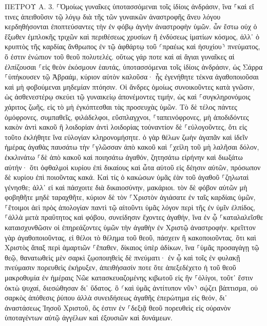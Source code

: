 \documentclass[twoside, 9pt]{extreport}
\begin{document}
ΠΕΤΡΟΥ Α.
3.
⸀Ὁμοίως γυναῖκες ὑποτασσόμεναι τοῖς ἰδίοις ἀνδράσιν, ἵνα ⸀καὶ εἴ τινες ἀπειθοῦσιν τῷ λόγῳ διὰ τῆς τῶν γυναικῶν ἀναστροφῆς ἄνευ λόγου κερδηθήσονται 
ἐποπτεύσαντες τὴν ἐν φόβῳ ἁγνὴν ἀναστροφὴν ὑμῶν. 
ὧν ἔστω οὐχ ὁ ἔξωθεν ἐμπλοκῆς τριχῶν καὶ περιθέσεως χρυσίων ἢ ἐνδύσεως ἱματίων κόσμος, 
ἀλλ᾽ ὁ κρυπτὸς τῆς καρδίας ἄνθρωπος ἐν τῷ ἀφθάρτῳ τοῦ ⸂πραέως καὶ ἡσυχίου⸃ πνεύματος, ὅ ἐστιν ἐνώπιον τοῦ θεοῦ πολυτελές. 
οὕτως γάρ ποτε καὶ αἱ ἅγιαι γυναῖκες αἱ ἐλπίζουσαι ⸀εἰς θεὸν ἐκόσμουν ἑαυτάς, ὑποτασσόμεναι τοῖς ἰδίοις ἀνδράσιν, 
ὡς Σάρρα ⸀ὑπήκουσεν τῷ Ἀβραάμ, κύριον αὐτὸν καλοῦσα· ἧς ἐγενήθητε τέκνα ἀγαθοποιοῦσαι καὶ μὴ φοβούμεναι μηδεμίαν πτόησιν. 
Οἱ ἄνδρες ὁμοίως συνοικοῦντες κατὰ γνῶσιν, ὡς ἀσθενεστέρῳ σκεύει τῷ γυναικείῳ ἀπονέμοντες τιμήν, ὡς καὶ ⸀συγκληρονόμοις χάριτος ζωῆς, εἰς τὸ μὴ ἐγκόπτεσθαι τὰς προσευχὰς ὑμῶν. 
Τὸ δὲ τέλος πάντες ὁμόφρονες, συμπαθεῖς, φιλάδελφοι, εὔσπλαγχνοι, ⸀ταπεινόφρονες, 
μὴ ἀποδιδόντες κακὸν ἀντὶ κακοῦ ἢ λοιδορίαν ἀντὶ λοιδορίας τοὐναντίον δὲ ⸀εὐλογοῦντες, ὅτι εἰς τοῦτο ἐκλήθητε ἵνα εὐλογίαν κληρονομήσητε. 
ὁ γὰρ θέλων ζωὴν ἀγαπᾶν καὶ ἰδεῖν ἡμέρας ἀγαθὰς παυσάτω τὴν ⸀γλῶσσαν ἀπὸ κακοῦ καὶ ⸀χείλη τοῦ μὴ λαλῆσαι δόλον, 
ἐκκλινάτω ⸀δὲ ἀπὸ κακοῦ καὶ ποιησάτω ἀγαθόν, ζητησάτω εἰρήνην καὶ διωξάτω αὐτήν· 
ὅτι ὀφθαλμοὶ κυρίου ἐπὶ δικαίους καὶ ὦτα αὐτοῦ εἰς δέησιν αὐτῶν, πρόσωπον δὲ κυρίου ἐπὶ ποιοῦντας κακά. 
Καὶ τίς ὁ κακώσων ὑμᾶς ἐὰν τοῦ ἀγαθοῦ ⸀ζηλωταὶ γένησθε; 
ἀλλ᾽ εἰ καὶ πάσχοιτε διὰ δικαιοσύνην, μακάριοι. τὸν δὲ φόβον αὐτῶν μὴ φοβηθῆτε μηδὲ ταραχθῆτε, 
κύριον δὲ τὸν ⸀Χριστὸν ἁγιάσατε ἐν ταῖς καρδίαις ὑμῶν, ⸀ἕτοιμοι ἀεὶ πρὸς ἀπολογίαν παντὶ τῷ αἰτοῦντι ὑμᾶς λόγον περὶ τῆς ἐν ὑμῖν ἐλπίδος, 
⸀ἀλλὰ μετὰ πραΰτητος καὶ φόβου, συνείδησιν ἔχοντες ἀγαθήν, ἵνα ἐν ᾧ ⸀καταλαλεῖσθε καταισχυνθῶσιν οἱ ἐπηρεάζοντες ὑμῶν τὴν ἀγαθὴν ἐν Χριστῷ ἀναστροφήν. 
κρεῖττον γὰρ ἀγαθοποιοῦντας, εἰ θέλοι τὸ θέλημα τοῦ θεοῦ, πάσχειν ἢ κακοποιοῦντας. 
ὅτι καὶ Χριστὸς ἅπαξ περὶ ἁμαρτιῶν ⸀ἔπαθεν, δίκαιος ὑπὲρ ἀδίκων, ἵνα ⸀ὑμᾶς προσαγάγῃ τῷ θεῷ, θανατωθεὶς μὲν σαρκὶ ζῳοποιηθεὶς δὲ πνεύματι· 
ἐν ᾧ καὶ τοῖς ἐν φυλακῇ πνεύμασιν πορευθεὶς ἐκήρυξεν, 
ἀπειθήσασίν ποτε ὅτε ἀπεξεδέχετο ἡ τοῦ θεοῦ μακροθυμία ἐν ἡμέραις Νῶε κατασκευαζομένης κιβωτοῦ εἰς ἣν ⸀ὀλίγοι, τοῦτ᾽ ἔστιν ὀκτὼ ψυχαί, διεσώθησαν δι᾽ ὕδατος. 
ὃ ⸂καὶ ὑμᾶς ἀντίτυπον νῦν⸃ σῴζει βάπτισμα, οὐ σαρκὸς ἀπόθεσις ῥύπου ἀλλὰ συνειδήσεως ἀγαθῆς ἐπερώτημα εἰς θεόν, δι᾽ ἀναστάσεως Ἰησοῦ Χριστοῦ, 
ὅς ἐστιν ἐν ⸀δεξιᾷ θεοῦ πορευθεὶς εἰς οὐρανὸν ὑποταγέντων αὐτῷ ἀγγέλων καὶ ἐξουσιῶν καὶ δυνάμεων. 
\end{document}
